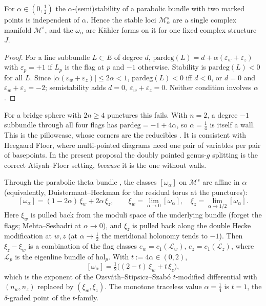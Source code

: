 \begin{proposition}\label{prop:nowalls}
For $\alpha\in(0,\tfrac12)$ the $\alpha$-(semi)stability of a parabolic bundle with two marked points is
independent of $\alpha$.  Hence the stable loci $\mathcal M^s_\alpha$ are a single complex manifold $\mathcal M^s$,
and the $\omega_\alpha$ are Kähler forms on it for one fixed complex structure $J$.
\end{proposition}
\begin{proof}
For a line subbundle $L\subset E$ of degree $d$, $\mathrm{pardeg}(L)=d+\alpha(\varepsilon_w+\varepsilon_z)$ with
$\varepsilon_p=+1$ if $L_p$ is the flag at $p$ and $-1$ otherwise.  Stability is $\mathrm{pardeg}(L)<0$ for all $L$.
Since $|\alpha(\varepsilon_w+\varepsilon_z)|\le2\alpha<1$, $\mathrm{pardeg}(L)<0$ iff $d<0$, or $d=0$ and
$\varepsilon_w+\varepsilon_z=-2$; semistability adds $d=0,\ \varepsilon_w+\varepsilon_z=0$.  Neither condition involves $\alpha$.
\end{proof}
\begin{remark}\label{rem:walls}
For a bridge sphere with $2n\ge4$ punctures this fails.  With $n=2$, a degree $-1$ subbundle through all four
flags has $\mathrm{pardeg}=-1+4\alpha$, so $\alpha=\tfrac14$ is itself a wall.  This is the pillowcase, whose
corners are the reducibles \cite{HHK1}.  It is consistent with Heegaard Floer, where multi-pointed diagrams
need one pair of variables per pair of basepoints.  In the present proposal the doubly pointed genus-$g$
splitting is the correct Atiyah--Floer setting, \emph{because} it is the one without walls.
\end{remark}

Through the parabolic theta bundle \cite{Pauly}, the classes $[\omega_\alpha]$ on $\mathcal M^s$ are affine in $\alpha$
(equivalently, Duistermaat--Heckman for the residual torus at the punctures):
\[
[\omega_\alpha]=(1-2\alpha)\,\xi_w+2\alpha\,\xi_z,\qquad \xi_w=\lim_{\alpha\to0}[\omega_\alpha],\quad \xi_z=\lim_{\alpha\to1/2}[\omega_\alpha].
\]
Here $\xi_w$ is pulled back from the moduli space of the underlying bundle (forget the flags; Mehta--Seshadri
at $\alpha\to0$), and $\xi_z$ is pulled back along the double Hecke modification at $w,z$ (at $\alpha\to\tfrac12$
the meridional holonomy tends to $-1$).  Then $\xi_z-\xi_w$ is a combination of the flag classes
$e_w=c_1(\mathcal L_w)$, $e_z=c_1(\mathcal L_z)$, where $\mathcal L_p$ is the eigenline bundle of $\mathrm{hol}_p$.  With
$t:=4\alpha\in(0,2)$,
\[
[\omega_\alpha]=\tfrac12\big((2-t)\,\xi_w+t\,\xi_z\big),
\]
which is the exponent of the Ozsv\'ath--Stipsicz--Szab\'o $t$-modified differential with $(n_w,n_z)$
replaced by $(\xi_w,\xi_z)$.  The monotone traceless value $\alpha=\tfrac14$ is $t=1$, the $\delta$-graded
point of the $t$-family.

